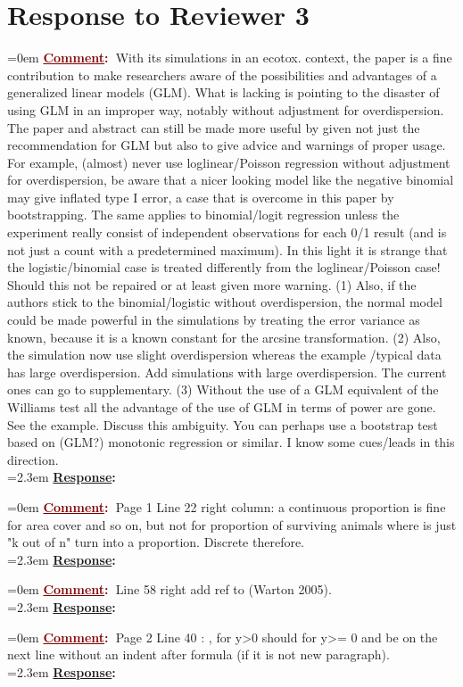 \documentclass[12pt]{article}
\newcommand{\comment}[0]{\vspace{1em} \noindent \hangindent=0em \textbf{\textcolor{Maroon}{\uline{Comment}:~}}}
\newcommand{\response}[0]{\\\vspace{0.1em} \hangindent=2.3em \textbf{\textcolor{NavyBlue}{\uline{Response}:~}}}
\begin{document}
\section{Response to Reviewer 3}

\comment With its simulations in an ecotox. context, the paper is a fine contribution to make researchers aware of the possibilities and advantages of a generalized linear models (GLM). What is lacking is pointing to the disaster of using GLM in an improper way, notably without adjustment for overdispersion. The paper and abstract can still be made more useful by given not just the recommendation for GLM but also to give advice and warnings of proper usage. For example, (almost) never use loglinear/Poisson regression without adjustment for overdispersion, be aware that a nicer looking model like the negative binomial may give inflated type I error, a case that is overcome in this paper by bootstrapping. The same applies to binomial/logit regression unless the experiment really consist of independent observations for each 0/1 result (and is not just a count with a predetermined maximum). In this light it is strange that the logistic/binomial case is treated differently from
the loglinear/Poisson case! Should this not be repaired or at least given more warning. 
(1) Also, if the authors stick to the binomial/logistic without overdispersion, the normal model could be made powerful in the simulations by treating the error variance as known, because it is a known constant for the arcsine transformation. 
(2) Also, the simulation now use slight overdispersion whereas the example /typical data has large overdispersion. Add simulations with large overdispersion. The current ones can go to supplementary.
(3) Without the use of a GLM equivalent of the Williams test all the advantage of the use of GLM in terms of power are gone.  See the example. Discuss this ambiguity. You can perhaps use a bootstrap test based on (GLM?) monotonic regression or similar. I know some cues/leads in this direction.
\response

\comment Page 1 Line 22 right column: a continuous proportion is fine for area cover and so on, but not for proportion of surviving animals where is just "k out of n" turn into a proportion. Discrete therefore. 
\response

\comment Line 58 right add ref to (Warton 2005). 
\response

\comment Page 2 Line 40 : , for y>0 should for y>= 0 and  be on the next line without an indent after formula (if it is not new paragraph).
\response
\end{document}
